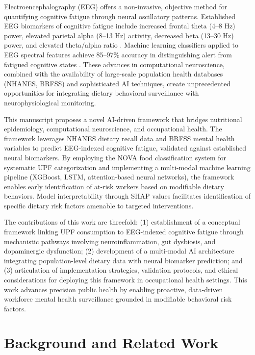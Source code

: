 \documentclass[journal,twoside,10pt]{IEEEtran}
\begin{document}
Electroencephalography (EEG) offers a non-invasive, objective method for quantifying cognitive fatigue through neural oscillatory patterns. Established EEG biomarkers of cognitive fatigue include increased frontal theta (4--8 Hz) power, elevated parietal alpha (8--13 Hz) activity, decreased beta (13--30 Hz) power, and elevated theta/alpha ratio \cite{ref1,ref4,ref10,ref18}. Machine learning classifiers applied to EEG spectral features achieve 85--97\% accuracy in distinguishing alert from fatigued cognitive states \cite{ref1,ref4,ref10,ref28}. These advances in computational neuroscience, combined with the availability of large-scale population health databases (NHANES, BRFSS) and sophisticated AI techniques, create unprecedented opportunities for integrating dietary behavioral surveillance with neurophysiological monitoring.

This manuscript proposes a novel AI-driven framework that bridges nutritional epidemiology, computational neuroscience, and occupational health. The framework leverages NHANES dietary recall data and BRFSS mental health variables to predict EEG-indexed cognitive fatigue, validated against established neural biomarkers. By employing the NOVA food classification system for systematic UPF categorization and implementing a multi-modal machine learning pipeline (XGBoost, LSTM, attention-based neural networks), the framework enables early identification of at-risk workers based on modifiable dietary behaviors. Model interpretability through SHAP values facilitates identification of specific dietary risk factors amenable to targeted interventions.

The contributions of this work are threefold: (1) establishment of a conceptual framework linking UPF consumption to EEG-indexed cognitive fatigue through mechanistic pathways involving neuroinflammation, gut dysbiosis, and dopaminergic dysfunction; (2) development of a multi-modal AI architecture integrating population-level dietary data with neural biomarker prediction; and (3) articulation of implementation strategies, validation protocols, and ethical considerations for deploying this framework in occupational health settings. This work advances precision public health by enabling proactive, data-driven workforce mental health surveillance grounded in modifiable behavioral risk factors.



\section{Background and Related Work}
\end{document}
